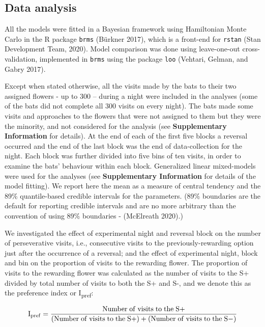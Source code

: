\documentclass[
]{article}
\begin{document}
\hypertarget{data-analysis}{%
\subsection{Data analysis}\label{data-analysis}}

All the models were fitted in a Bayesian framework using Hamiltonian Monte Carlo in the R package \texttt{brms} (Bürkner 2017), which is a front-end for \texttt{rstan} (Stan Development Team, 2020). Model comparison was done using leave-one-out cross-validation, implemented in \texttt{brms} using the package \texttt{loo} (Vehtari, Gelman, and Gabry 2017).

Except when stated otherwise, all the visits made by the bats to their two assigned flowers - up to 300 -- during a night were included in the analyses (some of the bats did not complete all 300 visits on every night). The bats made some visits and approaches to the flowers that were not assigned to them but they were the minority, and not considered for the analysis (see \textbf{Supplementary Information} for details). At the end of each of the first five blocks a reversal occurred and the end of the last block was the end of data-collection for the night. Each block was further divided into five bins of ten visits, in order to examine the bats' behaviour within each block. Generalized linear mixed-models were used for the analyses (see \textbf{Supplementary Information} for details of the model fitting). We report here the mean as a measure of central tendency and the 89\% quantile-based credible intervals for the parameters. (89\% boundaries are the default for reporting credible intervals and are no more arbitrary than the convention of using 89\% boundaries - (McElreath 2020).)

We investigated the effect of experimental night and reversal block on the number of perseverative visits, i.e., consecutive visits to the previously-rewarding option just after the occurrence of a reversal; and the effect of experimental night, block and bin on the proportion of visits to the rewarding flower. The proportion of visits to the rewarding flower was calculated as the number of visits to the S+ divided by total number of visits to both the S+ and S-, and we denote this as the preference index or I\textsubscript{pref}:

\[\mathrm{I_{pref}} = \displaystyle \frac{\rm Number \;of\; visits\; to\; the\; S+}{\rm (Number \;of\; visits\; to\; the\; S+) + (\rm Number \;of\; visits\; to\; the\; S-)}\]
\end{document}
